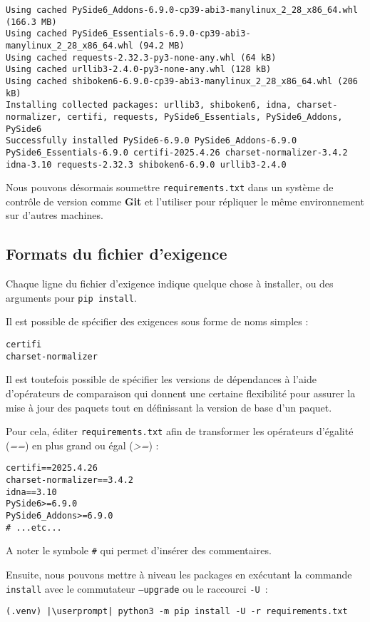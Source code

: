 \begin{lstlisting}[style=bash]
Using cached PySide6_Addons-6.9.0-cp39-abi3-manylinux_2_28_x86_64.whl (166.3 MB)
Using cached PySide6_Essentials-6.9.0-cp39-abi3-manylinux_2_28_x86_64.whl (94.2 MB)
Using cached requests-2.32.3-py3-none-any.whl (64 kB)
Using cached urllib3-2.4.0-py3-none-any.whl (128 kB)
Using cached shiboken6-6.9.0-cp39-abi3-manylinux_2_28_x86_64.whl (206 kB)
Installing collected packages: urllib3, shiboken6, idna, charset-normalizer, certifi, requests, PySide6_Essentials, PySide6_Addons, PySide6
Successfully installed PySide6-6.9.0 PySide6_Addons-6.9.0 PySide6_Essentials-6.9.0 certifi-2025.4.26 charset-normalizer-3.4.2 idna-3.10 requests-2.32.3 shiboken6-6.9.0 urllib3-2.4.0
\end{lstlisting}

Nous pouvons désormais soumettre \texttt{requirements.txt} dans un système de contrôle de version comme \textbf{Git} et l’utiliser pour répliquer le même environnement sur d’autres machines.

\subsection*{Formats du fichier d'exigence}
Chaque ligne du fichier d'exigence indique quelque chose à installer, ou des arguments pour \texttt{pip install}.

Il est possible de spécifier des exigences sous forme de noms simples :
\begin{lstlisting}[style=file]
certifi
charset-normalizer
\end{lstlisting}

Il est toutefois possible de spécifier les versions de dépendances à l’aide d’opérateurs de comparaison qui donnent une certaine flexibilité pour assurer la mise à jour des paquets tout en définissant la version de base d’un paquet.

Pour cela, éditer \texttt{requirements.txt} afin de transformer les opérateurs d’égalité (\textit{==}) en plus grand ou égal  (\textit{>=}) :
\begin{lstlisting}[style=file]
certifi==2025.4.26
charset-normalizer==3.4.2
idna==3.10
PySide6>=6.9.0
PySide6_Addons>=6.9.0
# ...etc...
\end{lstlisting}

A noter le symbole \texttt{\#} qui permet d'insérer des commentaires.

Ensuite, nous pouvons mettre à niveau les packages en exécutant la commande \texttt{install} avec le commutateur \texttt{--upgrade} ou le raccourci \texttt{-U} :
\begin{lstlisting}[style=bash]
(.venv) |\userprompt| python3 -m pip install -U -r requirements.txt
\end{lstlisting}

